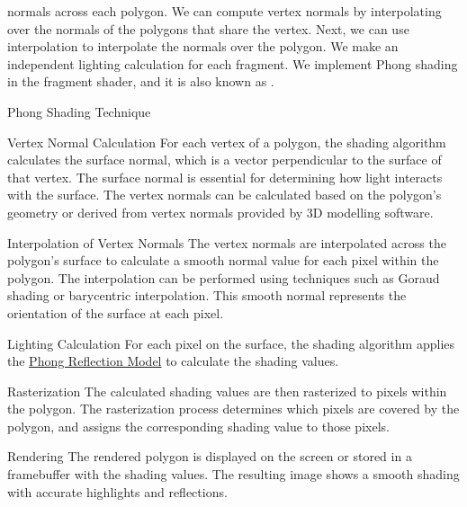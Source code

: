 \documentclass[../COS3712_Notes.tex]{subfiles}
\begin{document}
\begin{descriptimize}
          normals across each polygon.
          We can compute vertex normals by interpolating over the normals of the polygons
          that share the vertex.
          Next, we can use interpolation to interpolate the normals over the polygon.
          We make an independent lighting calculation for each fragment.
          We implement Phong shading in the fragment shader, and it is also known as
          .
          \begin{sidenote}{Phong Shading Technique}
            $ $\vspace{-1em}
            \begin{descriptenum}
              \item[Vertex Normal Calculation] For each vertex of a polygon,
                the shading algorithm calculates the surface normal, which is a vector
                perpendicular to the surface of that vertex.
                The surface normal is essential for determining how light interacts with the
                surface.
                The vertex normals can be calculated based on the polygon's geometry
                or derived from vertex normals provided by 3D modelling software.
              \item[Interpolation of Vertex Normals] The vertex normals are interpolated
                across the polygon's surface to calculate a smooth normal value for each pixel
                within the polygon.
                The interpolation can be performed using techniques such as Goraud shading
                or barycentric interpolation.
                This smooth normal represents the orientation of the surface at each pixel.
              \item[Lighting Calculation] For each pixel on the surface, the shading algorithm
                applies the \hyperref[sec:phong-reflection]{Phong Reflection Model}
                to calculate the shading values.
              \item[Rasterization] The calculated shading values are then rasterized
                to pixels within the polygon.
                The rasterization process determines which pixels are covered by the polygon,
                and assigns the corresponding shading value to those pixels.
              \item[Rendering] The rendered polygon is displayed on the screen or stored in a
                framebuffer with the shading values.
                The resulting image shows a smooth shading with accurate highlights
                and reflections.
            \end{descriptenum}
          \end{sidenote}
      \end{descriptimize}
\end{document}
